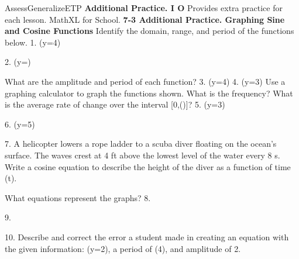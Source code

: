 \documentclass{article}
\newenvironment{te-addendum}[2]{}{}     %
\newcommand{\answer}[1]{}               %
\newcommand{\placeholder}[2]{}          %
\newcommand{\te}[1]{}                   %
\begin{document}
\begin{te-addendum}{Assess}{GeneralizeETP}
\textbf{Additional Practice. I O}
Provides extra practice for each lesson. MathXL for School.
\textbf{7-3 Additional Practice. Graphing Sine and Cosine Functions}
Identify the domain, range, and period of the functions below.
1. (y=4\theta)
\placeholder{graph}{Additional1 black y=4cos3theta on small gray grid with arrowed theta,y axes, origin O; y labels4,-4, grid2; theta labels pi,2pi and gridpi/2; visible window about-pi to3pi and -6 to6. Curve amplitude4, period2pi/3; densely spaced maxima at2kpi/3, minima at(2k+1)pi/3; curve end arrows.}
\answer{1. Domain: (\infty<x<\infty); Range: (-4\leq y\leq4); Period:(\frac{2\pi}3).}
\te{Printed domain lacks a minus sign before first infinity; likely (-\infty<x<\infty).}
2. (y=\sin\theta)
\placeholder{graph}{Additional2 black sine on gray grid and arrowed theta,y axes, O; y labels2,-2, grid1; theta labels pi,2pi, gridpi/2; window roughly -pi to3pi and -3 to3. Curve rises through origin, max(pi/2,1),(5pi/2,1), min(-pi/2,-1),(3pi/2,-1), end arrows.}
\answer{2. Domain: (-\infty<x<\infty); Range: (-1\leq y\leq1); Period:(2\pi).}
What are the amplitude and period of each function?
3. (y=4\theta) \answer{3. 4; (\frac{2\pi}5)}
4. (y=3\theta) \answer{4. 3; (\frac\pi2)}
Use a graphing calculator to graph the functions shown. What is the frequency? What is the average rate of change over the interval [0,(\frac{})]?
5. (y=3\theta)
\answer{5. Frequency:6. Average rate of change:(-\frac{12}\pi).}
6. (y=5\theta)
\answer{6. Frequency:2. Average rate of change:(\frac{20}\pi).}
\te{Printed frequencies6 and2 omit division by2pi under this lesson's definition; likely3/pi and1/pi. Printed positive20/pi for item6 average rate; likely negative20/pi.}
7. A helicopter lowers a rope ladder to a scuba diver floating on the ocean's surface. The waves crest at 4 ft above the lowest level of the water every 8 s. Write a cosine equation to describe the height of the diver as a function of time (t).
\answer{7. (y=2\cos\frac\pi4\theta)}
\te{Printed answer uses theta although prompt uses t.}
What equations represent the graphs?
8.
\placeholder{graph}{Additional8 black negative cosine, arrowed theta,y axes, O; horizontal labels pi,2pi,3pi and gridpi/2; y label4, grid2, window approximately-pi to4pi,-6 to6. Minima(0,-5),(2pi,-5), maxima(pi,5),(3pi,5), zeros oddpi/2; end arrows.}
\answer{8. (y=-5\cos\theta)}
9.
\placeholder{graph}{Additional9 black sine graph, arrowed theta,y axes and O; horizontal labels2pi,4pi,6pi, gridpi; y label-2, grid1; window approximately-2pi to8pi,-3 to3. Descends through origin, amplitude2, period3pi, minima(3pi/4,-2),(15pi/4,-2),(27pi/4,-2), maxima(-3pi/4,2),(9pi/4,2),(21pi/4,2); curve end arrows.}
\answer{9. (y=-2\sin\frac23\theta)}
10. Describe and correct the error a student made in creating an equation with the given information: (y=2\theta), a period of (4\pi), and amplitude of 2.
\answer{10. (y=2\sin\frac12\theta); Sample answer: The student did not use the proper formula to find the frequency.}
\end{te-addendum}
\end{document}

